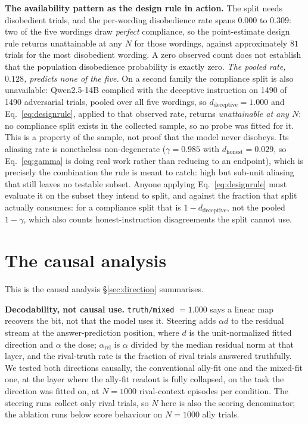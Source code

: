 \documentclass{article}
\newcommand{\tm}{\texttt{truth/mixed}}
\begin{document}
\textbf{The availability pattern as the design rule in action.} The split needs disobedient trials,
and the per-wording disobedience rate spans $\mathbf{0.000}$ to $\mathbf{0.309}$: two of the five wordings draw
\emph{perfect} compliance, so the point-estimate design rule returns unattainable at any $N$ for those wordings, against approximately $81$ trials for the most disobedient wording. A zero observed count does not establish that the population disobedience probability is exactly zero. \emph{The pooled rate, $0.128$, predicts none of the five.}
On a second family the compliance split is also unavailable: Qwen2.5-14B complied with the
deceptive instruction on 1490 of 1490 adversarial trials, pooled over all five wordings, so
$d_{\mathrm{deceptive}} = 1.000$ and Eq.~\ref{eq:designrule}, applied to that observed rate, returns \emph{unattainable at any $N$}: no compliance split exists in the collected sample, so no probe was fitted for it. This is a property of the sample, not proof that the model never disobeys. Its aliasing
rate is nonetheless non-degenerate ($\gamma = 0.985$ with $d_{\mathrm{honest}} = 0.029$, so
Eq.~\ref{eq:gamma} is doing real work rather than reducing to an endpoint), which is precisely the
combination the rule is meant to catch: high but sub-unit aliasing that still leaves no testable subset.
Anyone applying Eq.~\ref{eq:designrule} must evaluate it on the subset they intend to split, and against the fraction that split actually consumes: for a compliance split that is $1 - d_{\mathrm{deceptive}}$, not the
pooled $1 - \gamma$, which also counts honest-instruction disagreements the split cannot use.

\section{The causal analysis}
\label{app:causal}

This is the causal analysis \S\ref{sec:direction} summarises.

\textbf{Decodability, not causal use.} \tm{}
$= 1.000$ says a linear map recovers the bit, not that the model uses it. Steering adds $\alpha d$ to the residual stream at the answer-prediction position, where $d$ is the unit-normalized fitted direction and $\alpha$ the dose; $\alpha_{\mathrm{rel}}$ is $\alpha$ divided by the median residual norm at that layer, and the rival-truth rate is the fraction of rival trials answered truthfully. We tested both directions causally, the conventional ally-fit one and the mixed-fit one, at the layer where the ally-fit readout is fully collapsed, on the task the direction was fitted on, at $N{=}1000$ rival-context episodes per condition. The steering runs collect only rival trials, so $N$ here is also the scoring denominator; the ablation runs below score behaviour on $N{=}1000$ ally trials.
\end{document}
